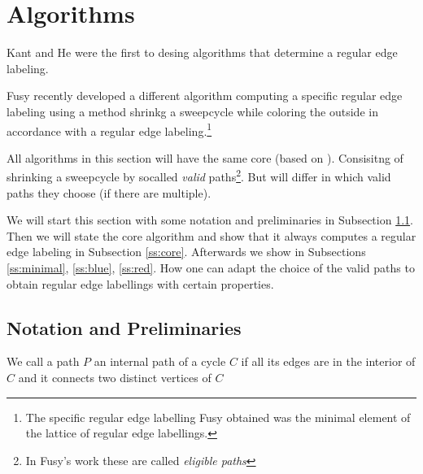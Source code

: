 

\newenvironment{invariants}{%
  \refstepcounter{thrm}%
  \paragraph{Invariants~\theprop}%
  \renewcommand*{\theenumi}{\theprop\,(I\arabic{enumi})}%
  \renewcommand*{\labelenumi}{(I\arabic{enumi})}%
  \enumerate
}{%
  \endenumerate
}



\section{Algorithms}
Kant and He \cite{KH} were the first to desing algorithms that determine a regular edge labeling. 

Fusy \cite{Fusy2006, Fusy2009} recently developed a different algorithm computing a specific regular edge labeling using a method shrinkg a sweepcycle while coloring the outside in accordance with a regular edge labeling.\footnote{The specific regular edge labelling Fusy obtained was the minimal element of the lattice of regular edge labellings.}

All algorithms in this section will have the same core (based on \cite{Fusy2006}). Consisitng of shrinking a sweepcycle by socalled \emph{valid} paths\footnote{In Fusy's work these are called \emph{eligible paths}}. But will differ in which valid paths they choose (if there are multiple).


We will start this section with some notation and preliminaries in Subsection \ref{ss:not}. Then we will state the core algorithm and show that it always computes a regular edge labeling in Subsection \ref{ss:core}. Afterwards we show in Subsections \ref{ss:minimal}, \ref{ss:blue}, \ref{ss:red}. How one can adapt the choice of the valid paths to obtain regular edge labellings with certain properties. 


\subsection{Notation and Preliminaries}
\label{ss:not}
\begin{defi}
We call a path $P$ an internal path of a cycle $C$ if all its edges are in the interior of $C$ and it connects two distinct vertices of $C$ 
\end{defi}

